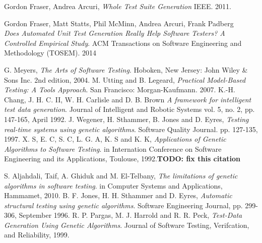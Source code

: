 \documentclass[runningheads]{llncs}
\begin{document}
\newpage
\begin{thebibliography}{9}

   Gordon Fraser, Andrea Arcuri,
   \emph{Whole Test Suite Generation}
   IEEE.
   2011.

   Gordon Fraser, Matt Statts, Phil McMinn, Andrea Arcuri, Frank Padberg\\
   \emph{Does Automated Unit Test Generation Really Help Software Testers? A Controlled Empirical Study}.
   ACM Transactions on Software Engineering and Methodology (TOSEM).
   2014
   
  G. Meyers,
  \emph{The Arts of Software Testing}.
  Hoboken, New Jersey: John Wiley \& Sons Inc.
  2nd edition,
   2004.
  M. Utting and B. Legeard,
  \emph{Practical Model-Based Testing: A Tools Approach}.
  San Francisco: Morgan-Kaufmann.
   2007.
  	K.-H. Chang, J. H. C. II, W. H. Carlisle and D. B. Brown
  \emph{A framework for intelligent test data generation}.
  Journal of Intelligent and Robotic Systems
  vol. 5, 
  no. 2, 
  pp. 147-165, 
  April 1992.
  	J. Wegener, H. Sthammer, B. Jones and D. Eyres,
  \emph{Testing real-time systems using genetic algorithms}.
  Software Quality Journal.
  pp. 127-135, 
  1997.    
  X. S, E. C, S. C, L. G. A, K. S and K. K,
  \emph{Applications of Genetic Algorithms to Software Testing}.
  in Internation Conference on Software Engineering and its Applications, 
  Toulouse, 
  1992.\textbf{TODO: fix this citation}
  
  	S. Aljahdali, Taif, A. Ghiduk and M. El-Telbany,
  \emph{The limitations of genetic algorithms in software testing}.
  in Computer Systems and Applications, 
  Hammamet, 
  2010. 
  	B. F. Jones, H. H. Sthammer and D. Eyres,
  \emph{Automatic structural testing using genetic algorithms}.
  Software Engineering Journal, 
  pp. 299-306, 
  September 1996.  
  	R. P. Pargas, M. J. Harrold and R. R. Peck,
  \emph{Test-Data Generation Using Genetic Algorithms}.
  Journal of Software Testing, Verifcation, and Reliability, 
  1999.      
\end{thebibliography}
\end{document}
